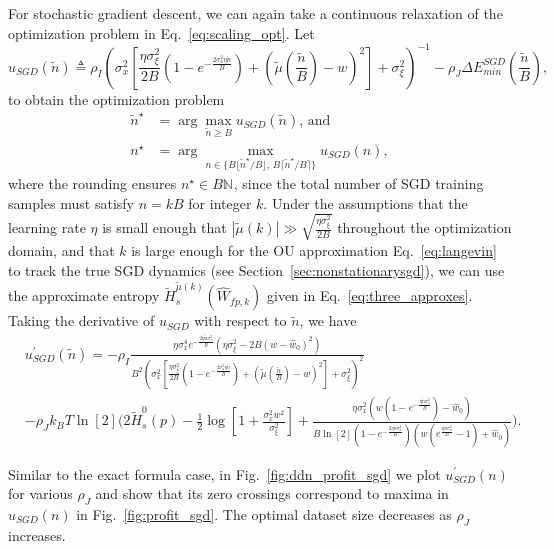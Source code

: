 \documentclass[12pt,onecolumn, margin=1in]{IEEEtran}
\newcommand{\bracket}[1]{\left[ #1 \right]}
\newcommand{\paren}[1]{\left( #1 \right)}
\newcommand{\N}[1]{\mathbb{N}^{#1}}
\newcommand{\Wh}{\hat{W}}
\newcommand{\wh}{\hat{w}}
\newcommand{\sigx}{\sigma_x}
\newcommand{\sigxi}{\sigma_\xi}
\newcommand{\Ht}{\tilde{H}}
\begin{document}
For stochastic gradient descent, we can again take a continuous relaxation of the optimization problem in Eq.~\eqref{eq:scaling_opt}. Let 
\begin{equation}\label{eq:u_sgd}
u_{SGD}(\tilde n) \triangleq \rho_I\paren{\sigx^2\bracket{\frac{\eta\sigxi^2}{2B}\paren{1 -e^{-\frac{2\sigx^2 \eta \tilde n}{B}}} + \paren{\tilde \mu\paren{\frac{\tilde n}{B}} - w}^2} + \sigxi^2}^{-1} - \rho_J \Delta E_{min}^{SGD}\paren{\frac{\tilde n}{B}},
\end{equation} 
to obtain the optimization problem
\begin{align}
    \tilde n^\star &= \arg\max\limits_{\tilde n \geq B} u_{SGD}(\tilde n) \text{, and } \nonumber\\
    n^\star &= \arg\max_{n\in\{B\lfloor \tilde n^\star/B\rfloor,\, B\lceil \tilde n^\star/B\rceil\}} u_{SGD}(n)\label{eq:nstar_sgd},
\end{align}
where the rounding ensures $n^\star \in B\N{}$, since the total number of SGD training samples must satisfy $n = kB$ for integer $k$.
Under the assumptions that the learning rate $\eta$ is small enough that $|\tilde \mu(k)| \gg \sqrt{\frac{\eta\sigxi^2}{2B}}$ throughout the optimization domain, and that $k$ is large enough for the OU approximation Eq.~\eqref{eq:langevin} to track the true SGD dynamics (see Section~\ref{sec:nonstationarysgd}), we can use the approximate entropy $\Ht^{\tilde \mu(k)}_s(\Wh_{fp,k})$ given in Eq.~\eqref{eq:three_approxes}. Taking the derivative of $u_{SGD}$ with respect to $\tilde n$, we have
\begin{align}
    &u^\prime_{SGD} (\tilde n) = -\rho_I\frac{\eta  \sigx^4 e^{-\frac{2 \eta  \tilde n \sigx^2}{B}} \left(\eta  \sigxi ^2-2 B (w-\wh_0)^2\right)}{B^2\paren{\sigx^2\bracket{\frac{\eta\sigxi^2}{2B}\paren{1 -e^{-\frac{2\sigx^2 \eta \tilde n}{B}}} + \paren{\tilde \mu\paren{\frac{\tilde n}{B}} - w}^2} + \sigxi^2}^{2}} \nonumber\\
    &- \rho_J k_BT \ln[2] \Bigg(2\Ht^0_{s}(p) - \frac{1}{2}\log\bracket{ 1 + \frac{\sigma^2_x w^2}{\sigma_\xi^2}}+ \frac{\eta  \sigx^2  \left(w \left(1-e^{-\frac{\eta  \tilde n \sigx^2}{B}}\right)-\wh_0 \right)}{B \ln\bracket{2} \left(1 - e^{-\frac{2 \eta  \tilde n \sigx^2}{B}}\right) \left(w \left(e^{\frac{\eta  \tilde n \sigx^2}{B}}-1\right)+\wh_0\right)}\Bigg).\label{eq:ddn_profit_sgd}
\end{align}

Similar to the exact formula case, in Fig.~\ref{fig:ddn_profit_sgd} we plot $u^\prime_{SGD} (n)$ for various $\rho_J$ and show that its zero crossings correspond to maxima in  $u_{SGD} (n)$ in Fig.~\ref{fig:profit_sgd}. The optimal dataset size decreases as $\rho_J$ increases.
\end{document}
